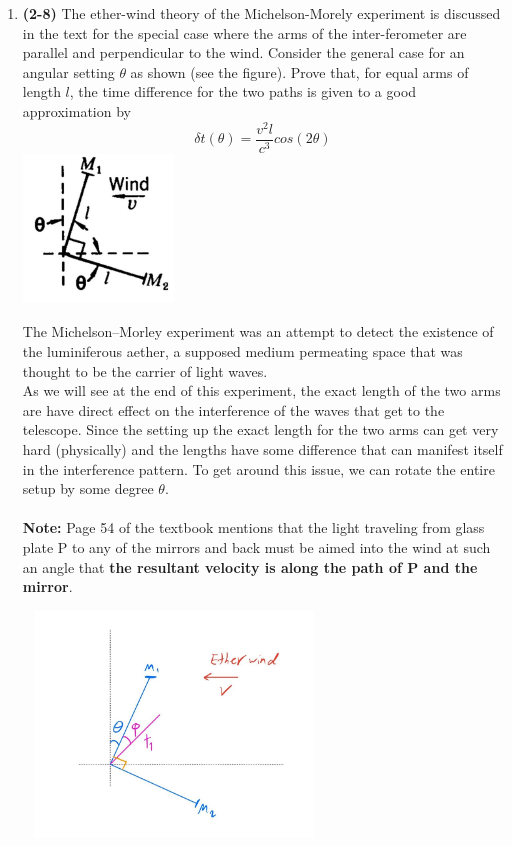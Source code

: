 \documentclass[fleqn]{article}
\begin{document}
  \begin{enumerate}
    \item \textbf{(2-8)} The ether-wind theory of the Michelson-Morely experiment is discussed in the text for 
    the special case where the arms of the inter-ferometer are parallel and perpendicular to the wind. Consider
    the general case for an angular setting $\theta$ as shown (see the figure). Prove that, for equal arms of length
    $l$, the time difference for the two paths is given to a good approximation by
    $$\delta t(\theta)=\dfrac{v^2 l}{c^3} cos(2 \theta)$$
    \includegraphics[height=4cm, width=4cm]{1.JPG}

      \textcolor{hwColor}{
        The Michelson–Morley experiment was an attempt to detect the existence of the luminiferous aether, 
        a supposed medium permeating space that was thought to be the carrier of light waves.
        \\
        As we will see at the end of this experiment, the exact length of the two arms are have direct 
        effect on the interference of the waves that get to the telescope. Since the setting up the exact length 
        for the two arms can get very hard (physically) and the lengths have some difference that can manifest 
        itself in the interference pattern. To get around this issue, we can rotate the entire setup by some degree $\theta$.
        \\
        \\
        \textbf{Note:} Page 54 of the textbook mentions that the light traveling from glass plate P to any of the mirrors
        and back must be aimed into the wind at such an angle that \textbf{the resultant velocity is along the path of P and the mirror}.
      }

      \includegraphics[height=6cm, width=8cm]{2.JPG}


\end{enumerate}
\end{document}
